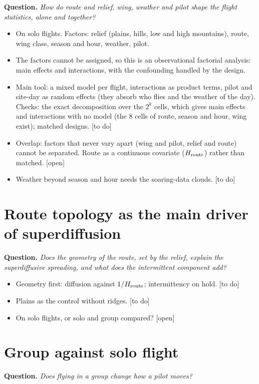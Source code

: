 \documentclass[11pt]{article}
\newcommand{\todo}{\textcolor{orange!85!black}{\textsf{[to do]}}}
\newcommand{\open}{\textcolor{red!70!black}{\textsf{[open]}}}
\newcommand{\Q}[1]{\noindent\textbf{Question.} \emph{#1}\par\smallskip}
\begin{document}
\Q{How do route and relief, wing, weather and pilot shape the flight statistics, alone and
together?}
\begin{itemize}
  \item On solo flights. Factors: relief (plains, hills, low and high mountains), route, wing class,
        season and hour, weather, pilot.
  \item The factors cannot be assigned, so this is an observational factorial analysis: main effects
        and interactions, with the confounding handled by the design.
  \item Main tool: a mixed model per flight, interactions as product terms, pilot and site-day as
        random effects (they absorb who flies and the weather of the day). Checks: the exact
        decomposition over the $2^k$ cells, which gives main effects and interactions with no model
        (the 8 cells of route, season and hour, wing exist); matched designs. \todo
  \item Overlap: factors that never vary apart (wing and pilot, relief and route) cannot be
        separated. Route as a continuous covariate ($H_{\rm route}$) rather than matched. \open
  \item Weather beyond season and hour needs the soaring-data clouds. \todo
\end{itemize}

\section{Route topology as the main driver of superdiffusion}

\Q{Does the geometry of the route, set by the relief, explain the superdiffusive spreading, and
what does the intermittent component add?}
\begin{itemize}
  \item Geometry first: diffusion against $1/H_{\rm route}$; intermittency on hold. \todo
  \item Plains as the control without ridges. \todo
  \item On solo flights, or solo and group compared? \open
\end{itemize}

\section{Group against solo flight}

\Q{Does flying in a group change how a pilot moves?}
\end{document}
